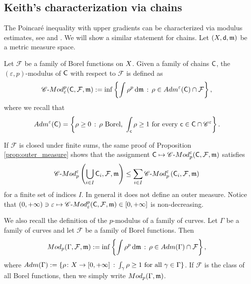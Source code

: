 \documentclass[12pt]{amsart}
\newcommand{\sfd}{{\sf d}}
\renewcommand{\d}{{\mathrm d}}
\newcommand{\X}{{\rm X}}
\newcommand{\Lip}{{\rm Lip}}
\newcommand{\mm}{\mathfrak m}
\theoremstyle{definition}
\newcommand{\Mod}{\textup{Mod}}
\newcommand{\cModepsilon}[2]{{\mathscr C}\text{-}{\rm Mod}_{#2}^{#1}}
\newcommand{\sfc}{{\sf c}}
\newcommand{\sfC}{{\sf C}}
\newcommand{\Chain}[1]{\mathscr{C}^{#1}}
\begin{document}
\subsection{Keith's characterization via chains}
\label{sec:keith_chain}

The Poincaré inequality with upper gradients can be characterized via modulus estimates, see \cite[Theorem 2]{Kei03} and \cite[Proposition A.1]{CaputoCavallucci2024II}. We will show a similar statement for chains. Let $(\X,\sfd,\mm)$ be a metric measure space.

Let $\mathcal{F}$ be a family of Borel functions on $\X$.
Given a family of chains $\sfC$, the $(\varepsilon,p)$-modulus of $\sfC$ with respect to $\mathcal{F}$ is defined as
$$\cModepsilon{p}{\varepsilon}(\sfC, \mathcal{F}, \mm) := \inf \left\{  \int \rho^p\,\d\mm\,:\, \rho \in {\rm Adm}^\varepsilon(\sfC) \cap \mathcal{F}\right\},$$
where we recall that 
$${\rm Adm}^{\varepsilon}({\sfC})=\left\{ \rho \ge 0\,:\, \rho \text{ Borel, }\int_{\sfc} \rho \ge 1 \text{ for every } \sfc \in {\sfC} \cap \Chain{\varepsilon} \right\}.$$

If $\mathcal{F}$ is closed under finite sums, the same proof of Proposition \ref{prop:outer_measure} shows that the assignment $\sfC \mapsto \cModepsilon{\varepsilon}{p}(\sfC, \mathcal{F}, \mm)$  satisfies 
\begin{equation}
    \label{eq:chain_modulus_subfamily_outer_measure}
    \cModepsilon{\varepsilon}{p}\left(\bigcup_{i\in I}\sfC_i, \mathcal{F} , \mm\right) \le \sum_{i\in I} \cModepsilon{\varepsilon}{p}\left(\sfC_i, \mathcal{F}, \mm\right)
\end{equation}
for a finite set of indices $I$. In general it does not define an outer measure. Notice that $ (0,+\infty) \ni \varepsilon \mapsto \cModepsilon{p}{\varepsilon}(\sfC, \mathcal{F}, \mm) \in [0,+\infty]$ is non-decreasing.
%
%


We also recall the definition of the $p$-modulus of a family of curves. Let $\Gamma$ be a family of curves and let $\mathcal{F}$ be a family of Borel functions. Then
$$\Mod_p(\Gamma, \mathcal{F}, \mm) := \inf\left\{ \int \rho^p \,\d\mm\,:\, \rho \in {\rm Adm}(\Gamma) \cap \mathcal{F}\right\},$$
where ${\rm Adm}(\Gamma) := \{ \rho \colon \X \to [0,+\infty] \, : \, \int_\gamma \rho \ge 1 \text{ for all } \gamma \in \Gamma\}$. If $\mathcal{F}$ is the class of all Borel functions, then we simply write $\Mod_p(\Gamma, \mm)$. 
\end{document}

